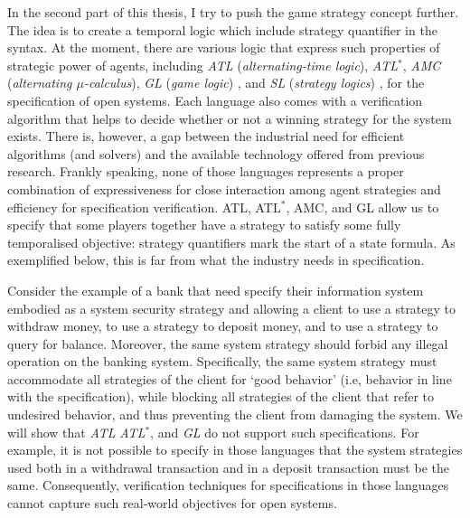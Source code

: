 In the second part of this thesis, I try to push the game strategy concept further.
The idea is to create a temporal logic which include strategy quantifier in the syntax.
At the moment, there are various logic that express such properties of strategic power of agents,
including {\em ATL} ({\em alternating-time logic}), 
{\em ATL}$^*$, {\em AMC} ({\em alternating $\mu$-calculus}),
{\em GL} ({\em game logic}) \cite{AHK02}, 
and {\em SL} ({\em strategy logics}) \cite{CLM10,CHP10,MMV10}, 
for the specification of open systems.  
Each language also comes with a verification algorithm that helps to decide whether or not a winning strategy for the system exists.
There is, however, a gap between the industrial need for efficient algorithms (and solvers) and the available technology offered from previous research.
Frankly speaking, none of those languages represents a proper combination of expressiveness for close interaction among agent strategies and efficiency for specification verification.  
ATL, ATL$^*$, AMC, and GL \cite{AHK02} allow us to specify that some players together have a strategy to satisfy some fully temporalised objective: strategy quantifiers mark the start of a state formula.
As exemplified below, this is far from\label{reply1.falls.short.far.from} what the industry needs in specification.  


Consider the example of a bank that need specify their information system 
embodied as a system security strategy and 
allowing a client to use a strategy to withdraw money, 
to use a strategy to deposit money, and to use a strategy to query for balance.  
Moreover, the same system strategy should forbid any illegal 
operation on the banking system.  
Specifically, the same system strategy must accommodate all strategies 
of the client for `good behavior' 
(i.e, behavior in line with the specification), 
while blocking all strategies of the client that refer to undesired behavior, 
and thus preventing the client from damaging the system.
We will show that 
{\em ATL} %
{\em ATL}$^*$, %
and 
{\em GL} %
\cite{AHK02}  
do not support such specifications.  
For example, it is not possible to specify in those languages that 
the system strategies used both in a withdrawal transaction and 
in a deposit transaction must be the same.  
Consequently, verification techniques for specifications in those languages 
cannot capture such real-world objectives for open systems.  

